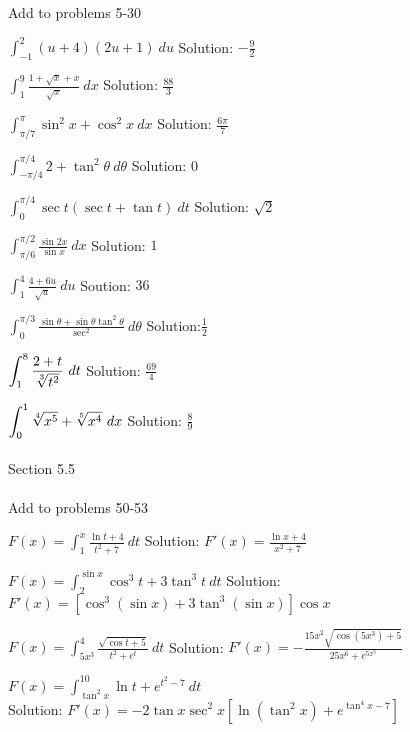 \documentclass[10pt]{article}
\newcommand{\ds}{\displaystyle}
\begin{document}
Add to problems 5-30  %


$\ds \int_{-1}^2 (u+4)(2u+1)~du$				Solution: $-\frac92$

$\ds \int_1^9 \frac{1+\sqrt x +x}{\sqrt x}~dx$		Solution: $\frac{88}{3}$

$\ds \int_{\pi/7}^{\pi} \sin^2 x+\cos^2 x ~dx$			Solution: $\frac{6\pi}{7}$

$\ds \int_{-\pi/4}^{\pi/4} 2+\tan^2 \theta ~d\theta$			Solution: $0$

$\ds \int_0^{\pi/4} \sec t(\sec t+\tan t)~dt$			Solution: $\sqrt 2$

$\ds \int_{\pi/6}^{\pi/2} \frac {\sin 2x}{\sin x}~dx$			Solution: $1$

$\ds \int_1^4 \frac{4+6u}{\sqrt u}~du$			Soution: $36$

$\ds \int_0^{\pi/3} \frac{\sin\theta+\sin\theta\tan^2\theta}{\sec^2}~d\theta$		Solution:$\frac12$

$\ds \int_1^8 \frac{2+t}{\root 3 \of{t^2}}~dt$		Solution: $\frac{69}{4}$

$\ds \int_0^1 \root 4 \of{x^5} +\root 5 \of {x^4}~dx$	Solution: $\frac89$\\ \\



Section 5.5  \\ \\


Add to problems 50-53

$\ds F(x)=\int_1^{x} \frac{\ln t+4}{t^2+7}~dt$		Solution: $F'(x)=\frac{\ln x+4}{x^2+7}$

$\ds F(x)= \int_2^{\sin x} \cos^3 t+3\tan^3 t~dt$		Solution: $F'(x)=[\cos^3(\sin x)+3\tan^3(\sin x)]\cos x $

$\ds F(x)= \int_{5x^3}^4 \frac{\sqrt{\cos t+5}}{t^2+e^t}~dt $		Solution: $F'(x)=-\frac{15x^2\sqrt{\cos (5x^3)+5}}{25x^6+e^{5x^3}}$

$\ds  F(x)=\int_{\tan^2 x}^{10} \ln t +e^{t^2-7}~dt$		\\Solution: $F'(x)= -2\tan x\sec^2 x[\ln (\tan^2x) +e^{\tan^4x-7}]$
\end{document}
